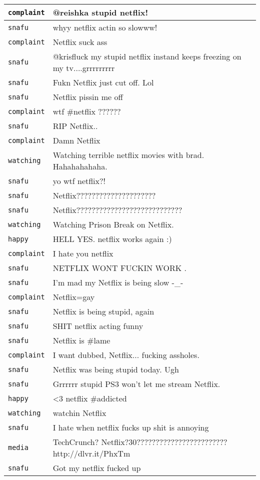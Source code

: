 {\begin{longtable}{|l|p{160mm}|}
      \tabularnewline\hline
         \texttt{complaint} & @reishka stupid netflix!
      \tabularnewline\hline
         \texttt{snafu} & whyy netflix actin so slowww!
      \tabularnewline\hline
         \texttt{complaint} & Netflix suck ass
      \tabularnewline\hline
         \texttt{snafu} & @krisfluck my stupid netflix instand keeps freezing on my tv....grrrrrrrrr
      \tabularnewline\hline
         \texttt{snafu} & Fukn Netflix just cut off. Lol
      \tabularnewline\hline
         \texttt{snafu} & Netflix pissin me off
      \tabularnewline\hline
         \texttt{complaint} & wtf \#netflix ??????
      \tabularnewline\hline
         \texttt{snafu} & RIP Netflix..
      \tabularnewline\hline
         \texttt{complaint} & Damn Netflix
      \tabularnewline\hline
         \texttt{watching} & Watching terrible netflix movies with brad. Hahahahahaha.
      \tabularnewline\hline
         \texttt{snafu} & yo wtf netflix?!
      \tabularnewline\hline
         \texttt{snafu} & Netflix?????????????????????
      \tabularnewline\hline
         \texttt{snafu} & Netflix????????????????????????????
      \tabularnewline\hline
         \texttt{watching} & Watching Prison Break on Netflix.
      \tabularnewline\hline
         \texttt{happy} & HELL YES. netflix works again :)
      \tabularnewline\hline
         \texttt{complaint} & I hate you netflix
      \tabularnewline\hline
         \texttt{snafu} & NETFLIX WONT FUCKIN WORK .
      \tabularnewline\hline
         \texttt{snafu} & I'm mad my Netflix is being slow -\_-
      \tabularnewline\hline
         \texttt{complaint} & Netflix=gay
      \tabularnewline\hline
         \texttt{snafu} & Netflix is being stupid, again
      \tabularnewline\hline
         \texttt{snafu} & SHIT netflix acting funny
      \tabularnewline\hline
         \texttt{snafu} & Netflix is \#lame
      \tabularnewline\hline
         \texttt{complaint} & I want dubbed, Netflix... fucking assholes.
      \tabularnewline\hline
         \texttt{snafu} & Netflix was being stupid today. Ugh
      \tabularnewline\hline
         \texttt{snafu} & Grrrrrr stupid PS3 won't let me stream Netflix.
      \tabularnewline\hline
         \texttt{happy} & <3 netflix \#addicted
      \tabularnewline\hline
         \texttt{watching} & watchin Netflix
      \tabularnewline\hline
         \texttt{snafu} & I hate when netflix fucks up shit is annoying
      \tabularnewline\hline
         \texttt{media} & TechCrunch? Netflix?30???????????????????????? http://dlvr.it/PhxTm
      \tabularnewline\hline
         \texttt{snafu} & Got my netflix fucked up
      \tabularnewline\hline

\end{longtable}}
